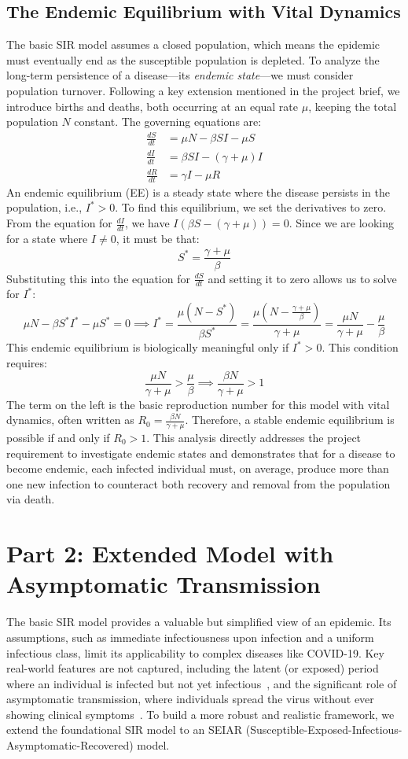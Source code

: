 \documentclass[12pt, a4paper]{article}
\begin{document}
\subsection{The Endemic Equilibrium with Vital Dynamics}
The basic SIR model assumes a closed population, which means the epidemic must eventually end as the susceptible population is depleted. To analyze the long-term persistence of a disease—its \textit{endemic state}—we must consider population turnover. Following a key extension mentioned in the project brief, we introduce births and deaths, both occurring at an equal rate $\mu$, keeping the total population $N$ constant. The governing equations are:
\begin{align}
    \frac{dS}{dt} &= \mu N - \beta SI - \mu S \\
    \frac{dI}{dt} &= \beta SI - (\gamma + \mu)I \\
    \frac{dR}{dt} &= \gamma I - \mu R
\end{align}
An endemic equilibrium (EE) is a steady state where the disease persists in the population, i.e., $I^* > 0$. To find this equilibrium, we set the derivatives to zero. From the equation for $\frac{dI}{dt}$, we have $I(\beta S - (\gamma + \mu)) = 0$. Since we are looking for a state where $I \neq 0$, it must be that:
\[ S^* = \frac{\gamma + \mu}{\beta} \]
Substituting this into the equation for $\frac{dS}{dt}$ and setting it to zero allows us to solve for $I^*$:
\[ \mu N - \beta S^* I^* - \mu S^* = 0 \implies I^* = \frac{\mu(N - S^*)}{\beta S^*} = \frac{\mu(N - \frac{\gamma + \mu}{\beta})}{\gamma + \mu} = \frac{\mu N}{\gamma + \mu} - \frac{\mu}{\beta} \]
This endemic equilibrium is biologically meaningful only if $I^* > 0$. This condition requires:
\[ \frac{\mu N}{\gamma + \mu} > \frac{\mu}{\beta} \implies \frac{\beta N}{\gamma + \mu} > 1 \]
The term on the left is the basic reproduction number for this model with vital dynamics, often written as $R_0 = \frac{\beta N}{\gamma + \mu}$. Therefore, a stable endemic equilibrium is possible if and only if $R_0 > 1$. This analysis directly addresses the project requirement to investigate endemic states and demonstrates that for a disease to become endemic, each infected individual must, on average, produce more than one new infection to counteract both recovery and removal from the population via death.

\section{Part 2: Extended Model with Asymptomatic Transmission}
The basic SIR model provides a valuable but simplified view of an epidemic. Its assumptions, such as immediate infectiousness upon infection and a uniform infectious class, limit its applicability to complex diseases like COVID-19. Key real-world features are not captured, including the latent (or exposed) period where an individual is infected but not yet infectious~\cite{Wong2020}, and the significant role of asymptomatic transmission, where individuals spread the virus without ever showing clinical symptoms~\cite{Byambasuren2020}. To build a more robust and realistic framework, we extend the foundational SIR model to an SEIAR (Susceptible-Exposed-Infectious-Asymptomatic-Recovered) model.
\end{document}
